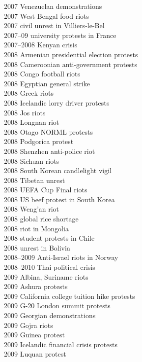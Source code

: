 2007 Venezuelan demonstrations\\
2007 West Bengal food riots\\
2007 civil unrest in Villiers-le-Bel\\
2007–09 university protests in France\\
2007–2008 Kenyan crisis\\
2008 Armenian presidential election protests\\
2008 Cameroonian anti-government protests\\
2008 Congo football riots\\
2008 Egyptian general strike\\
2008 Greek riots\\
2008 Icelandic lorry driver protests\\
2008 Jos riots\\
2008 Longnan riot\\
2008 Otago NORML protests\\
2008 Podgorica protest\\
2008 Shenzhen anti-police riot\\
2008 Sichuan riots\\
2008 South Korean candlelight vigil\\
2008 Tibetan unrest\\
2008 UEFA Cup Final riots\\
2008 US beef protest in South Korea\\
2008 Weng'an riot\\
2008 global rice shortage\\
2008 riot in Mongolia\\
2008 student protests in Chile\\
2008 unrest in Bolivia\\
2008–2009 Anti-Israel riots in Norway\\
2008–2010 Thai political crisis\\
2009 Albina, Suriname riots\\
2009 Ashura protests\\
2009 California college tuition hike protests\\
2009 G-20 London summit protests\\
2009 Georgian demonstrations\\
2009 Gojra riots\\
2009 Guinea protest\\
2009 Icelandic financial crisis protests\\
2009 Luquan protest\\
